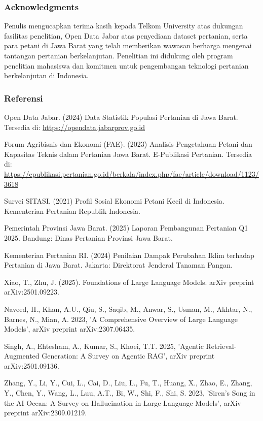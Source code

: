\documentclass{article} %
\begin{document}
\subsubsection*{Acknowledgments}

Penulis mengucapkan terima kasih kepada Telkom University atas dukungan fasilitas penelitian, Open Data Jabar atas penyediaan dataset pertanian, serta para petani di Jawa Barat yang telah memberikan wawasan berharga mengenai tantangan pertanian berkelanjutan. Penelitian ini didukung oleh program penelitian mahasiswa dan komitmen untuk pengembangan teknologi pertanian berkelanjutan di Indonesia.

\subsubsection*{Referensi}
\begin{thebibliography}{9}

 Open Data Jabar. (2024) Data Statistik Populasi Pertanian di Jawa Barat. Tersedia di: \url{https://opendata.jabarprov.go.id}

 Forum Agribisnis dan Ekonomi (FAE). (2023) Analisis Pengetahuan Petani dan Kapasitas Teknis dalam Pertanian Jawa Barat. E-Publikasi Pertanian. Tersedia di: \url{https://epublikasi.pertanian.go.id/berkala/index.php/fae/article/download/1123/3618}

 Survei SITASI. (2021) Profil Sosial Ekonomi Petani Kecil di Indonesia. Kementerian Pertanian Republik Indonesia.

 Pemerintah Provinsi Jawa Barat. (2025) Laporan Pembangunan Pertanian Q1 2025. Bandung: Dinas Pertanian Provinsi Jawa Barat.

 Kementerian Pertanian RI. (2024) Penilaian Dampak Perubahan Iklim terhadap Pertanian di Jawa Barat. Jakarta: Direktorat Jenderal Tanaman Pangan.

 Xiao, T., Zhu, J. (2025). Foundations of Large Language Models. arXiv preprint arXiv:2501.09223.

 Naveed, H., Khan, A.U., Qiu, S., Saqib, M., Anwar, S., Usman, M., Akhtar, N., Barnes, N., Mian, A. 2023, 'A Comprehensive Overview of Large Language Models', arXiv preprint arXiv:2307.06435.

 Singh, A., Ehtesham, A., Kumar, S., Khoei, T.T. 2025, 'Agentic Retrieval-Augmented Generation: A Survey on Agentic RAG', arXiv preprint arXiv:2501.09136.

Zhang, Y., Li, Y., Cui, L., Cai, D., Liu, L., Fu, T., Huang, X., Zhao, E., Zhang, Y., Chen, Y., Wang, L., Luu, A.T., Bi, W., Shi, F., Shi, S. 2023, 'Siren's Song in the AI Ocean: A Survey on Hallucination in Large
  Language Models', arXiv preprint arXiv:2309.01219.


\end{thebibliography}
\end{document}
